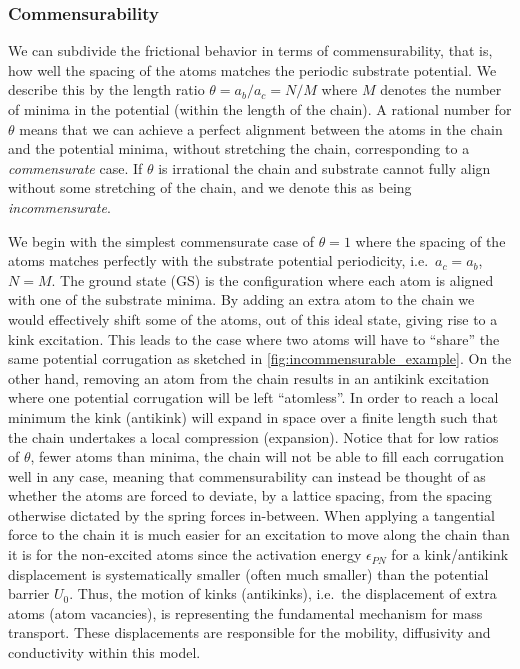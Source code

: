 \subsubsection{Commensurability} We can subdivide the frictional behavior in terms of commensurability, that is, how well the spacing of the atoms matches the periodic substrate potential. We describe this by the length ratio $\theta = a_b / a_c = N / M$ where $M$ denotes the number of minima in the potential (within the length of the chain). A rational number for $\theta$ means that we can achieve a perfect alignment between the atoms in the chain and the potential minima, without stretching the chain, corresponding to a \textit{commensurate} case. If $\theta$ is irrational the chain and substrate cannot fully align without some stretching of the chain, and we denote this as being \textit{incommensurate}.

We begin with the simplest commensurate case of $\theta = 1$ where the spacing
of the atoms matches perfectly with the substrate potential periodicity, i.e.\
$a_c = a_b$, $N = M$. The ground state (\acrshort{GS}) is the configuration
where each atom is aligned with one of the substrate minima. By adding an extra
atom to the chain we would effectively shift some of the atoms, out of this
ideal state, giving rise to a kink excitation. This leads to the case where two
atoms will have to ``share'' the same potential corrugation as sketched in
\cref{fig:incommensurable_example}.  On the other hand, removing an atom from
the chain results in an antikink excitation where one potential corrugation will
be left ``atomless''. In order to reach a local minimum the kink (antikink) will
expand in space over a finite length such that the chain undertakes a local
compression (expansion). Notice that for low ratios of $\theta$, fewer atoms than minima, the chain will not be able to fill each corrugation well in any case, meaning that commensurability can instead be thought of as whether the atoms are forced to deviate, by a lattice spacing, from the spacing otherwise dictated by the spring forces in-between. When applying a tangential force to the chain it is much
easier for an excitation to move along the chain than it is for the non-excited
atoms since the activation energy $\epsilon_{PN}$ for a kink/antikink
displacement is systematically smaller (often much smaller) than the potential
barrier $U_0$. Thus, the motion of kinks (antikinks), i.e.\ the displacement of
extra atoms (atom vacancies), is representing the fundamental mechanism for
mass transport. These displacements are responsible for the mobility,
diffusivity and conductivity within this model. 

